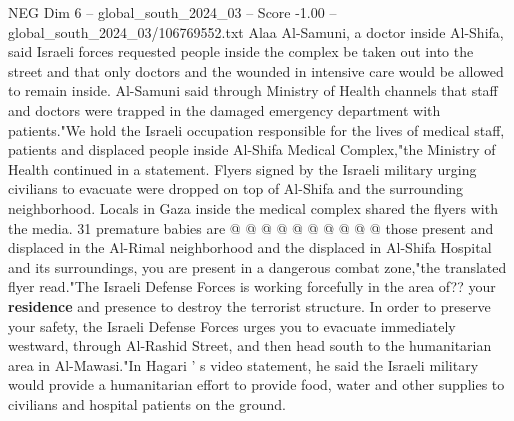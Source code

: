 \begin{textsample}{NEG Dim 6 – global\_south\_2024\_03 – Score -1.00 – global\_south\_2024\_03/106769552.txt}
Alaa Al-Samuni, a doctor inside Al-Shifa, said Israeli forces requested people inside the complex be taken out into the street and that only doctors and the wounded in intensive care would be allowed to remain inside.
Al-Samuni said through Ministry of Health channels that staff and doctors were trapped in the damaged emergency department with patients."We hold the Israeli occupation responsible for the lives of medical staff, patients and displaced people inside Al-Shifa Medical Complex,"the Ministry of Health continued in a statement.
Flyers signed by the Israeli military urging civilians to evacuate were dropped on top of Al-Shifa and the surrounding neighborhood.
Locals in Gaza inside the medical complex shared the flyers with the media. 31 premature babies are @ @ @ @ @ @ @ @ @ @ those present and displaced in the Al-Rimal neighborhood and the displaced in Al-Shifa Hospital and its surroundings, you are present in a dangerous combat zone,"the translated flyer read."The Israeli Defense Forces is working forcefully in the area of?? your \textbf{residence} and presence to destroy the terrorist structure.
In order to preserve your safety, the Israeli Defense Forces urges you to evacuate immediately westward, through Al-Rashid Street, and then head south to the humanitarian area in Al-Mawasi."In Hagari ' s video statement, he said the Israeli military would provide a humanitarian effort to provide food, water and other supplies to civilians and hospital patients on the ground.

\end{textsample}
